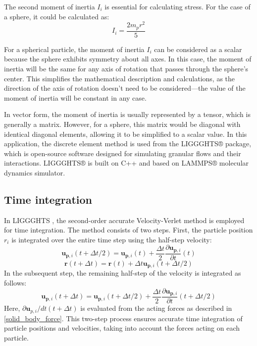 The second moment of inertia $I_i$ is essential for calculating stress. For the case of a sphere, it could be calculated as:
\begin{equation}
I_{i}=\frac{2 m_{p} r^{2}}{5}
\end{equation}

For a spherical particle, the moment of inertia \( I_i \) can be considered as a scalar because the sphere exhibits symmetry about all axes. In this case, the moment of inertia will be the same for any axis of rotation that passes through the sphere's center. This simplifies the mathematical description and calculations, as the direction of the axis of rotation doesn't need to be considered—the value of the moment of inertia will be constant in any case.

In vector form, the moment of inertia is usually represented by a tensor, which is generally a matrix. However, for a sphere, this matrix would be diagonal with identical diagonal elements, allowing it to be simplified to a scalar value.
In this application, the discrete element method is used from the LIGGGHTS® package, which is open-source software designed for simulating granular flows and their interactions. LIGGGHTS® is built on C++ and based on LAMMPS® molecular dynamics simulator.

\subsection{Time integration}

In LIGGGHTS \cite{kloss2011liggghts}, the second-order accurate Velocity-Verlet method is employed for time integration. The method consists of two steps. First, the particle position $r_i$ is integrated over the entire time step using the half-step velocity:
\begin{equation}
\mathbf{u}_{\mathbf{p},i}(t+\Delta t / 2)=\mathbf{u}_{\mathbf{p},i}(t)+\frac{\Delta t}{2} \frac{\partial \mathbf{u}_{\mathbf{p},i}}{\partial t}(t)
\end{equation}
\begin{equation}
\mathbf{r}(t+\Delta t)=\mathbf{r}(t)+\Delta t \mathbf{u}_{\mathbf{p},i}(t+\Delta t / 2)
\end{equation}
In the subsequent step, the remaining half-step of the velocity is integrated as follows:
\begin{equation}
\mathbf{u}_{\mathbf{p},i}(t+\Delta t)=\mathbf{u}_{\mathbf{p},i}(t+\Delta t / 2)+\frac{\Delta t}{2} \frac{\partial \mathbf{u}_{\mathbf{p},i}}{\partial t}(t+\Delta t / 2)
\end{equation}
Here, $\partial \mathbf{u}_{p,i}/dt(t+\Delta t)$ is evaluated from the acting forces as described in \ref{solid_body_force}. This two-step process ensures accurate time integration of particle positions and velocities, taking into account the forces acting on each particle.

